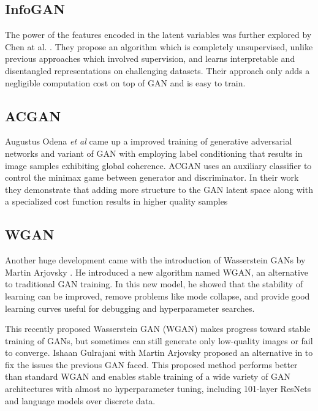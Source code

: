 \documentclass{vldb}
\begin{document}
\subsection{InfoGAN} %
\label{sec:infogan}
The power of the features encoded in the latent variables was further explored by Chen at al. \cite{infogan}. They propose an algorithm which is completely unsupervised, unlike previous approaches which involved supervision, and learns interpretable and disentangled representations on challenging datasets. Their approach only adds a negligible computation cost on top of GAN and is easy to train.
\par\bigskip


\subsection{ACGAN} %
\label{sec:acgan}
Augustus Odena \textit{et al} \cite{acgan} came up a improved training of generative adversarial networks and variant of GAN with employing label conditioning that results in image samples exhibiting global coherence. ACGAN uses an auxiliary classifier to control the minimax game between generator and discriminator. In their work they demonstrate that adding more structure to the GAN latent space along with a specialized cost function results in higher quality samples

\subsection{WGAN} %
\label{sec:wgan}
Another huge development came with the introduction of Wasserstein GANs by Martin Arjovsky \cite{wgan} . He introduced a new algorithm named WGAN, an alternative to traditional GAN training. In this new model, he showed that the stability of learning can be improved, remove problems like mode collapse, and provide good learning curves useful for debugging and hyperparameter searches.
\par\bigskip

This recently proposed Wasserstein GAN (WGAN) \cite{wgan} makes progress toward stable training of GANs, but sometimes can still generate only low-quality images or fail to converge. 
Ishaan Gulrajani with Martin Arjovsky proposed an alternative in \cite{improvedwgan} to fix the issues the previous GAN faced. This proposed method performs better than standard WGAN and enables stable training of a wide variety of GAN architectures with almost no hyperparameter tuning, including 101-layer ResNets \cite{deepresidual} and language models over discrete data.
\par\bigskip
\end{document}
